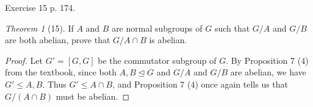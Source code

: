 \documentclass[12pt]{article}
\theoremstyle{remark}
\theoremstyle{named}
\newtheorem*{theorem}{Theorem}
\newcommand{\normal}{\trianglelefteq}
\begin{document}
Exercise 15 p. 174.

\begin{theorem}[15]
    If \(A\) and \(B\) are normal subgroups of \(G\) such that \(G / A\) and \(G / B\) are both abelian, prove that \(G / A \cap B\) is abelian.
\end{theorem}

\begin{proof}
    Let \(G' = [G, G]\) be the commutator subgroup of \(G\). By Proposition 7 (4) from the textbook, since both \(A, B \normal G\) and \(G / A\) and \(G / B\) are abelian, we have \(G' \le A, B\). Thus \(G' \le A \cap B\), and Proposition 7 (4) once again tells us that \(G / (A \cap B)\) must be abelian.
\end{proof}
\end{document}

